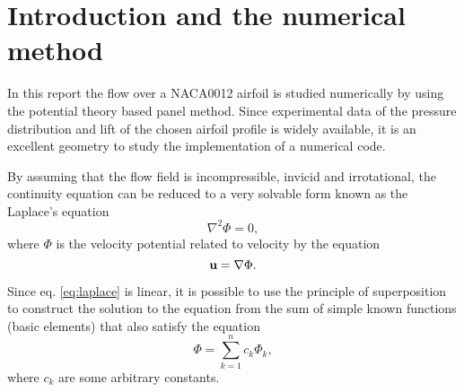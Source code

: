 \documentclass[a4paper,12pt]{article}
\begin{document}
\section{Introduction and the numerical method}
In this report the flow over a NACA0012 airfoil is studied numerically by using the potential theory based panel method. Since experimental data of the pressure distribution and lift of the chosen airfoil profile is widely available\cite{NASA}, it is an excellent geometry to study the implementation of a numerical code. 

By assuming that the flow field is incompressible, invicid and irrotational, the continuity equation can be reduced to a very solvable form known as the Laplace's equation
\begin{equation}
\nabla^2 \Phi = 0,
\label{eq:laplace}
\end{equation}
where $\Phi$ is the velocity potential related to velocity by the equation 
\begin{equation}
\bold{u}=\nabla \Phi.
\label{eq:relation}
\end{equation}

Since eq. \ref{eq:laplace} is linear, it is possible to use the principle of superposition to construct the solution to the equation from the sum of simple known functions (basic elements) that also satisfy the equation
\begin{equation}
\Phi = \sum_{k=1}^n c_k\Phi_k,
\end{equation}
where $c_k$ are some arbitrary constants.
\end{document}
